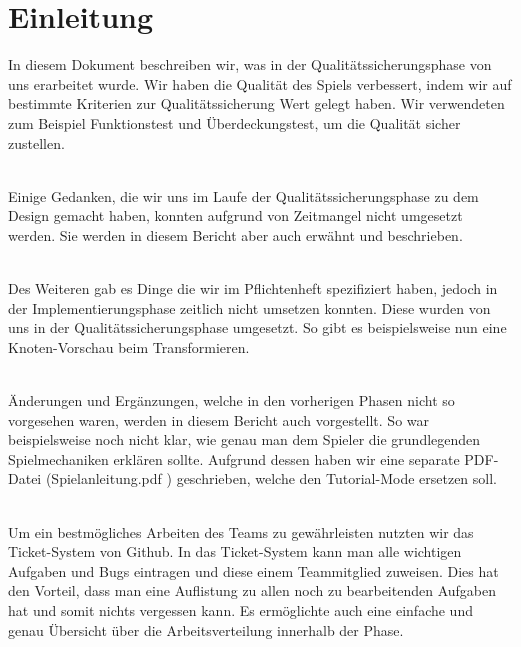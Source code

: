 %



\chapter{Einleitung}
\label{Kapitel:Einleitung}

In diesem Dokument beschreiben wir, was in der Qualitätssicherungsphase von uns erarbeitet wurde.
Wir haben die Qualität des Spiels verbessert, indem wir auf bestimmte Kriterien zur Qualitätssicherung Wert gelegt haben. Wir verwendeten zum Beispiel Funktionstest und Überdeckungstest, um die Qualität sicher zustellen.\\~

Einige Gedanken, die wir uns im Laufe der Qualitätssicherungsphase zu dem Design gemacht haben, konnten aufgrund von Zeitmangel nicht umgesetzt werden. Sie werden in diesem Bericht aber auch erwähnt und beschrieben.\\~

Des Weiteren gab es Dinge die wir im Pflichtenheft spezifiziert haben, jedoch in der Implementierungsphase zeitlich nicht umsetzen konnten. Diese wurden von uns in der Qualitätssicherungsphase umgesetzt. So gibt es beispielsweise nun eine Knoten-Vorschau beim Transformieren.\\~

Änderungen und Ergänzungen, welche in den vorherigen Phasen nicht so vorgesehen waren, werden in diesem Bericht auch vorgestellt. So war beispielsweise noch nicht klar, wie genau man dem Spieler die grundlegenden Spielmechaniken erklären sollte. Aufgrund dessen haben wir eine separate PDF-Datei (\glqq Spielanleitung.pdf \grqq) geschrieben, welche den Tutorial-Mode ersetzen soll.\\~

Um ein bestmögliches Arbeiten des Teams zu gewährleisten nutzten wir das Ticket-System von Github. In das Ticket-System kann man alle wichtigen Aufgaben und Bugs eintragen und diese einem Teammitglied zuweisen. Dies hat den Vorteil, dass man eine Auflistung zu allen noch zu bearbeitenden Aufgaben hat und somit nichts vergessen kann. Es ermöglichte auch eine einfache und genau Übersicht über die Arbeitsverteilung innerhalb der Phase.
 











